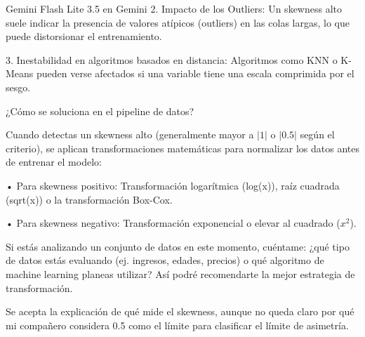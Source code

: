 \documentclass[12pt,a4paper,oneside]{book}
\begin{document}
\begin{iaresp}{Gemini Flash Lite 3.5 en Gemini}
2. Impacto de los Outliers: Un skewness alto suele indicar la presencia de valores atípicos (outliers) en las colas largas, lo que puede distorsionar el entrenamiento.

3. Inestabilidad en algoritmos basados en distancia: Algoritmos como KNN o K-Means pueden verse afectados si una variable tiene una escala comprimida por el sesgo.

¿Cómo se soluciona en el pipeline de datos?

Cuando detectas un skewness alto (generalmente mayor a \(\vert{}1\vert{}\) o \(\vert{}0.5\vert{}\) según el criterio), se aplican transformaciones matemáticas para normalizar los datos antes de entrenar el modelo:

• Para skewness positivo: Transformación logarítmica (log(x)), raíz cuadrada (sqrt(x)) o la transformación Box-Cox.

• Para skewness negativo: Transformación exponencial o elevar al cuadrado (\(x^{2}\)).

Si estás analizando un conjunto de datos en este momento, cuéntame: ¿qué tipo de datos estás evaluando (ej. ingresos, edades, precios) o qué algoritmo de machine learning planeas utilizar? Así podré recomendarte la mejor estrategia de transformación.
\end{iaresp}
\begin{iaanalisis}
Se acepta la explicación de qué mide el skewness, aunque no queda claro por qué mi compañero considera 0.5 como el límite para clasificar el límite de asimetría.
\end{iaanalisis}
\end{document}
